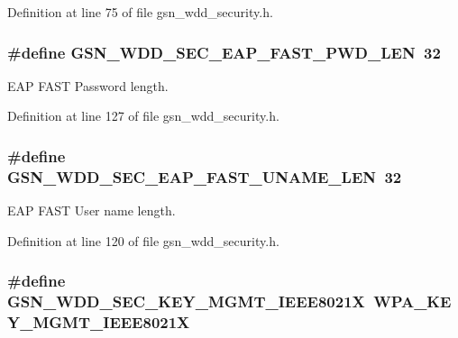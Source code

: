 Definition at line 75 of file gsn\_\-wdd\_\-security.h.

\hypertarget{a00604_a502f775f90fe2c3b3792bd7b203980ff}{
\subsubsection[{GSN\_\-WDD\_\-SEC\_\-EAP\_\-FAST\_\-PWD\_\-LEN}]{\setlength{\rightskip}{0pt plus 5cm}\#define GSN\_\-WDD\_\-SEC\_\-EAP\_\-FAST\_\-PWD\_\-LEN~32}}
\label{a00604_a502f775f90fe2c3b3792bd7b203980ff}


EAP FAST Password length. 



Definition at line 127 of file gsn\_\-wdd\_\-security.h.

\hypertarget{a00604_a321137b997df37274a82b1bfa7f766cb}{
\subsubsection[{GSN\_\-WDD\_\-SEC\_\-EAP\_\-FAST\_\-UNAME\_\-LEN}]{\setlength{\rightskip}{0pt plus 5cm}\#define GSN\_\-WDD\_\-SEC\_\-EAP\_\-FAST\_\-UNAME\_\-LEN~32}}
\label{a00604_a321137b997df37274a82b1bfa7f766cb}


EAP FAST User name length. 



Definition at line 120 of file gsn\_\-wdd\_\-security.h.

\hypertarget{a00604_a1abb34c938af83c33fb62cb19d7aca8b}{
\subsubsection[{GSN\_\-WDD\_\-SEC\_\-KEY\_\-MGMT\_\-IEEE8021X}]{\setlength{\rightskip}{0pt plus 5cm}\#define GSN\_\-WDD\_\-SEC\_\-KEY\_\-MGMT\_\-IEEE8021X~WPA\_\-KEY\_\-MGMT\_\-IEEE8021X}}
\label{a00604_a1abb34c938af83c33fb62cb19d7aca8b}


